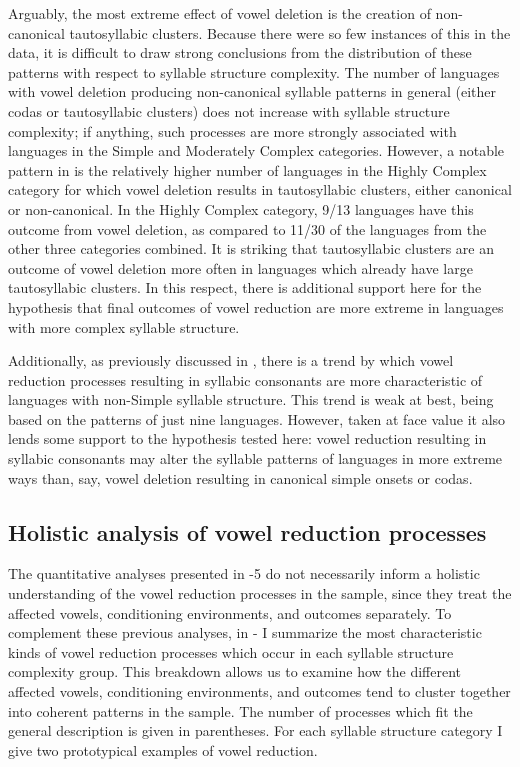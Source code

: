   Arguably, the most extreme effect of vowel deletion is the creation of non-canonical tautosyllabic clusters. Because there were so few instances of this in the data, it is difficult to draw strong conclusions from the distribution of these patterns with respect to syllable structure complexity. The number of languages with vowel deletion producing non-canonical syllable patterns in general (either codas or tautosyllabic clusters) does not increase with syllable structure complexity; if anything, such processes are more strongly associated with languages in the Simple and Moderately Complex categories. However, a notable pattern in  is the relatively higher number of languages in the Highly Complex category for which vowel deletion results in tautosyllabic clusters, either canonical or non-canonical. In the Highly Complex category, 9/13 languages have this outcome from vowel deletion, as compared to 11/30 of the languages from the other three categories combined. It is striking that tautosyllabic clusters are an outcome of vowel deletion more often in languages which already have large tautosyllabic clusters. In this respect, there is additional support here for the hypothesis that final outcomes of vowel reduction are more extreme in languages with more complex syllable structure.   

  Additionally, as previously discussed in , there is a trend by which vowel reduction processes resulting in syllabic consonants are more characteristic of languages with non-Simple syllable structure. This trend is weak at best, being based on the patterns of just nine languages. However, taken at face value it also lends some support to the hypothesis tested here: vowel reduction resulting in syllabic consonants may alter the syllable patterns of languages in more extreme ways than, say, vowel deletion resulting in canonical simple onsets or codas.

\subsection{Holistic analysis of vowel reduction processes}\label{sec:6.3.6}

  The quantitative analyses presented in -5 do not necessarily inform a holistic understanding of the vowel reduction processes in the sample, since they treat the affected vowels, conditioning environments, and outcomes separately. To complement these previous analyses, in - I summarize the most characteristic kinds of vowel reduction processes which occur in each syllable structure complexity group. This breakdown allows us to examine how the different affected vowels, conditioning environments, and outcomes tend to cluster together into coherent patterns in the sample. The number of processes which fit the general description is given in parentheses. For each syllable structure category I give two prototypical examples of vowel reduction.

